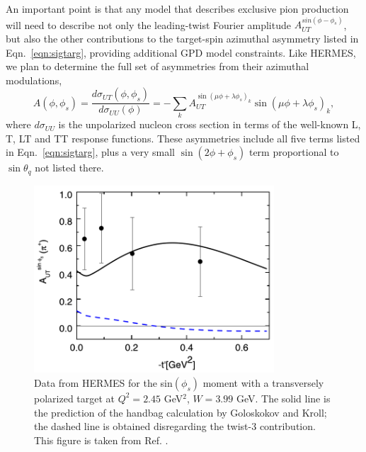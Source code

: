 An important point is that any model that describes exclusive pion production
will need to describe not only the leading-twist Fourier amplitude
$A_{UT}^{sin(\phi-\phi_s)}$, but also the other contributions to the
target-spin azimuthal asymmetry listed in Eqn.~\ref{eqn:sigtarg}, providing
additional GPD model constraints.  Like HERMES, we plan to determine the full
set of asymmetries from their azimuthal modulations,
\begin{equation}
A(\phi,\phi_s)=\frac{d\sigma_{UT}(\phi,\phi_s)}{d\sigma_{UU}(\phi)}
=-\sum_k A_{UT}^{\sin(\mu\phi+\lambda\phi_s)_k}\sin(\mu\phi+\lambda\phi_s)_k ,
\end{equation}
where 
$d\sigma_{UU}$ is the unpolarized nucleon cross section in terms of the well-known
L, T, LT and TT response functions.  These asymmetries include all five terms
listed in Eqn.~\ref{eqn:sigtarg}, plus a very small $\sin(2\phi+\phi_s)$ term
proportional to $\sin\theta_q$ not listed there.

\begin{figure}[hbt!]
\begin{center}
\includegraphics[height=7cm]{./figures/hermes_sinphiS.png}
\end{center}
\caption{\label{fig:hermes_phiS}
\footnotesize{
Data from HERMES for the sin$(\phi_s)$ moment with a transversely polarized
target at $Q^2=2.45$ GeV$^2$, $W=3.99$ GeV.  The solid line is the prediction
of the handbag calculation by Goloskokov and Kroll; the dashed line is obtained
disregarding the twist-3 contribution.  This figure is taken from
Ref. .}}
\end{figure}

